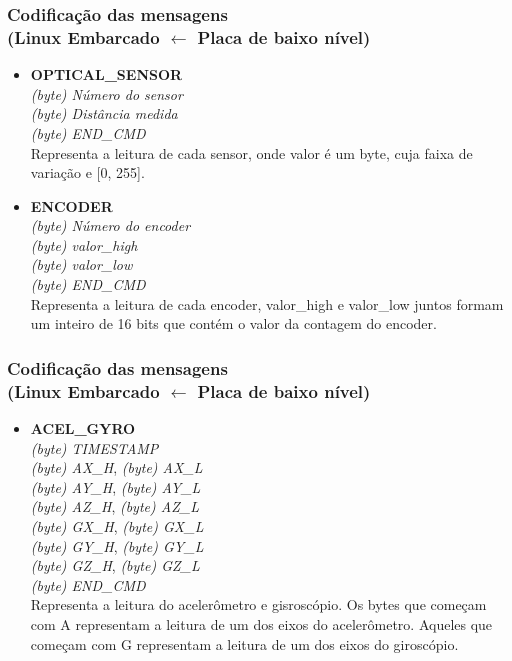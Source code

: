 \documentclass{beamer}
\begin{document}
	\begin{frame}
	\frametitle{Codificação das mensagens\\ (Linux Embarcado $\leftarrow$ Placa de baixo nível)}
	  \begin{itemize}
	  
	  \item \textbf{OPTICAL\_SENSOR}\\
	   \textit{(byte) Número do sensor}\\
	   \textit{(byte) Distância medida}\\
	   \textit{(byte) END\_CMD}\\
	   Representa a leitura de cada sensor, onde valor é um byte, cuja faixa de variação e [0, 255].
	   
	  \item \textbf{ENCODER}\\
	  \textit{(byte) Número do encoder}\\
	  \textit{(byte) valor\_high}\\
	  \textit{(byte) valor\_low}\\
	  \textit{(byte) END\_CMD}\\
	  Representa a leitura de cada encoder, valor\_high e valor\_low juntos formam um inteiro de 16 bits que contém o valor da contagem do encoder.
	  
	  \end{itemize}
	\end{frame}
	\begin{frame}
	\frametitle{Codificação das mensagens\\ (Linux Embarcado $\leftarrow$ Placa de baixo nível)}
	  \begin{itemize}
	  \item \textbf{ACEL\_GYRO}\\
	  \textit{(byte) TIMESTAMP}\\
	  \textit{(byte) AX\_H}, \textit{(byte) AX\_L}\\
	  \textit{(byte) AY\_H}, \textit{(byte) AY\_L}\\
	  \textit{(byte) AZ\_H}, \textit{(byte) AZ\_L}\\
	  \textit{(byte) GX\_H}, \textit{(byte) GX\_L}\\
	  \textit{(byte) GY\_H}, \textit{(byte) GY\_L}\\
	  \textit{(byte) GZ\_H}, \textit{(byte) GZ\_L}\\
	  \textit{(byte) END\_CMD}\\
	  Representa a leitura do acelerômetro e gisroscópio. Os bytes que começam com A representam a leitura de um dos eixos do acelerômetro. Aqueles que começam com G representam a leitura de um dos eixos do giroscópio.
	\end{itemize}
  \end{frame}
  
\end{document}
